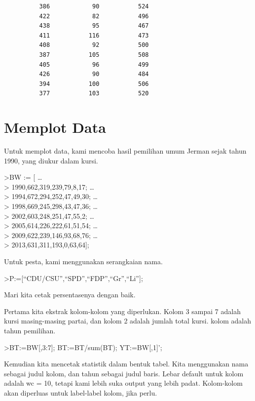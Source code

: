 \documentclass[
]{book}
\begin{document}
\begin{verbatim}
          386            90           524 
          422            82           496 
          438            95           467 
          411           116           473 
          408            92           500 
          387           105           508 
          405            96           499 
          426            90           484 
          394           100           506 
          377           103           520 
\end{verbatim}

\section{Memplot Data}\label{memplot-data}

Untuk memplot data, kami mencoba hasil pemilihan umum Jerman sejak tahun 1990, yang diukur dalam kursi.

\textgreater BW := {[} \ldots{}\\
\textgreater{} 1990,662,319,239,79,8,17; \ldots{}\\
\textgreater{} 1994,672,294,252,47,49,30; \ldots{}\\
\textgreater{} 1998,669,245,298,43,47,36; \ldots{}\\
\textgreater{} 2002,603,248,251,47,55,2; \ldots{}\\
\textgreater{} 2005,614,226,222,61,51,54; \ldots{}\\
\textgreater{} 2009,622,239,146,93,68,76; \ldots{}\\
\textgreater{} 2013,631,311,193,0,63,64{]};

Untuk pesta, kami menggunakan serangkaian nama.

\textgreater P:={[}``CDU/CSU'',``SPD'',``FDP'',``Gr'',``Li''{]};

Mari kita cetak persentasenya dengan baik.

Pertama kita ekstrak kolom-kolom yang diperlukan. Kolom 3 sampai 7 adalah kursi masing-masing partai, dan kolom 2 adalah jumlah total kursi. kolom adalah tahun pemilihan.

\textgreater BT:=BW{[},3:7{]}; BT:=BT/sum(BT); YT:=BW{[},1{]}';

Kemudian kita mencetak statistik dalam bentuk tabel. Kita menggunakan nama sebagai judul kolom, dan tahun sebagai judul baris. Lebar default untuk kolom adalah wc = 10, tetapi kami lebih suka output yang lebih padat. Kolom-kolom akan diperluas untuk label-label kolom, jika perlu.
\end{document}
